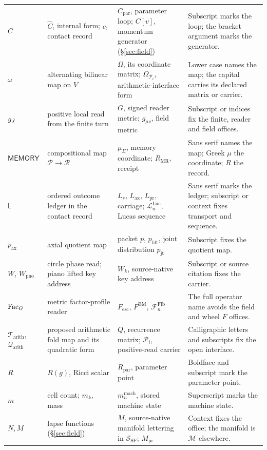 \documentclass[11pt,a4paper]{article}
\newcommand{\Lax}{L_{\mathrm{ax}}}\newcommand{\Lpr}{L_{\mathrm{pr}}}
\newcommand{\Fesc}{F_{\mathrm{esc}}}
\newcommand{\MEM}{\mathsf{MEMORY}}
\newcommand{\Fib}[1]{\mathcal{F}^{\mathrm{Fib}}_{#1}}\newcommand{\Luc}[1]{\mathcal{L}^{\mathrm{Luc}}_{#1}}
\newcommand{\Mpr}{M_{\mathrm{pr}}}\newcommand{\Kpr}{K_{\mathrm{pr}}}\newcommand{\Upr}{U_{\mathrm{pr}}}
\newcommand{\FEM}{F^{\mathrm{EM}}}
\theoremstyle{plain}
\theoremstyle{definition}
\theoremstyle{remark}
\begin{document}
{\begin{longtable}{@{}>{\raggedright\arraybackslash}p{1.9cm}>{\raggedright\arraybackslash}p{4.0cm}>{\raggedright\arraybackslash}p{4.9cm}>{\raggedright\arraybackslash}p{4.0cm}@{}}
$C$ & $\hat C$, internal form; $c$, contact record & $C_{\mathrm{par}}$, parameter loop; $C[v]$, momentum generator (\S\ref{sec:field}) & Subscript marks the loop; the bracket argument marks the generator.\\
$\omega$ & alternating bilinear map on $V$ & $\Omega$, its coordinate matrix; $\Omega_{\mathcal P_i}$, arithmetic-interface form & Lower case names the map; the capital carries its declared matrix or carrier.\\
$g_J$ & positive local read from the finite turn & $G$, signed reader metric; $g_{\mu\nu}$, field metric & Subscript or indices fix the finite, reader and field offices.\\
$\MEM$ & compositional map $\mathcal P\to\mathcal R$ & $\mu_\Sigma$, memory coordinate; $R_{\mathrm{MR}}$, receipt & Sans serif names the map; Greek $\mu$ the coordinate; $R$ the record.\\
$\mathsf L$ & ordered outcome ledger in the contact record & $L_s$, $\Lax$, $\Lpr$, carriage; $\Luc n$, Lucas sequence & Sans serif marks the ledger; subscript or context fixes transport and sequence.\\
$p_{\mathrm{ax}}$ & axial quotient map & packet $p$, $p_{\mathrm{lift}}$, joint distribution $p_{\mathrm{jt}}$ & Subscript fixes the quotient map.\\
$W$, $W_{\mathrm{pno}}$ & circle phase read; piano lifted key address & $W_k$, source-native key address & Subscript or source citation fixes the carrier.\\
$\mathrm{Fac}_G$ & metric factor-profile reader & $\Fesc$, $\FEM$, $\Fib n$ & The full operator name avoids the field and wheel $F$ offices.\\
$\mathcal T_{\mathrm{arith}}$, $\mathcal Q_{\mathrm{arith}}$ & proposed arithmetic fold map and its quadratic form & $Q$, recurrence matrix; $\mathcal P_i$, positive-read carrier & Calligraphic letters and subscripts fix the open interface.\\
$R$ & $R(g)$, Ricci scalar & $R_{\mathrm{par}}$, parameter point & Boldface and subscript mark the parameter point.\\
$m$ & cell count; $m_k$, mass & $m^{\mathrm{mach}}_n$, stored machine state & Superscript marks the machine state.\\
$N,M$ & lapse functions (\S\ref{sec:field}) & $M$, source-native manifold lettering in $\mathcal S_{\mathrm{SF}}$; $\Mpr$ & Context fixes the office; the manifold is $\mathcal M$ elsewhere.\\
\end{longtable}}
\end{document}
